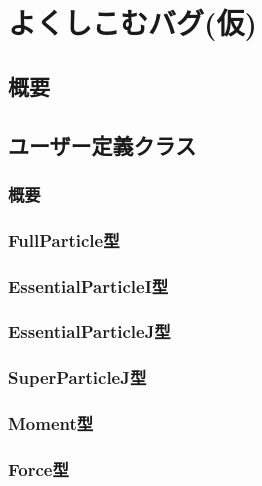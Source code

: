 \documentclass[12pt,a4paper]{jarticle}
\begin{document}

\newpage

\section{よくしこむバグ(仮)}

\subsection{概要}

\subsection{ユーザー定義クラス}

\subsubsection{概要}

\subsubsection{FullParticle型}

\subsubsection{EssentialParticleI型}

\subsubsection{EssentialParticleJ型}

\subsubsection{SuperParticleJ型}

\subsubsection{Moment型}

\subsubsection{Force型}
\end{document}

